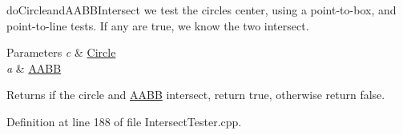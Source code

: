 do\+Circleand\+A\+A\+B\+B\+Intersect we test the circle\textquotesingle{}s center, using a point-\/to-\/box, and point-\/to-\/line tests. If any are true, we know the two intersect. 


\begin{DoxyParams}{Parameters}
{\em c} & \hyperlink{class_circle}{Circle} \\
\hline
{\em a} & \hyperlink{class_a_a_b_b}{A\+A\+BB} \\
\hline
\end{DoxyParams}
\begin{DoxyReturn}{Returns}
if the circle and \hyperlink{class_a_a_b_b}{A\+A\+BB} intersect, return true, otherwise return false. 
\end{DoxyReturn}


Definition at line 188 of file Intersect\+Tester.\+cpp.


